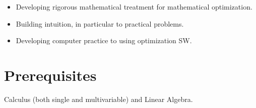 \begin{itemize}
  \item Developing rigorous mathematical treatment for mathematical optimization.

  \item Building intuition, in particular to practical problems.

  \item Developing computer practice to using optimization SW.

\end{itemize}


\section*{Prerequisites}\label{cha:prerequisites}

Calculus (both single and multivariable) and Linear Algebra.

\clearpage
{
  \tiny
  \tableofcontents
}
